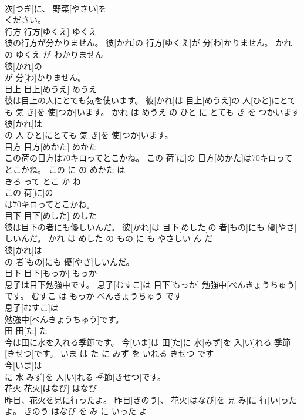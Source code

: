 \documentclass[8pt]{extreport}
\begin{document}
\begin{CJK}{UTF8}{min}
\\	次[つぎ]に、 野菜[やさい]を
\\	ください。			
\\	行方	行方[ゆくえ]	ゆくえ	
\\	彼の行方が分かりません。	彼[かれ]の 行方[ゆくえ]が 分[わ]かりません。	かれ の ゆくえ が わかりません	
\\	彼[かれ]の
\\	が 分[わ]かりません。			
\\	目上	目上[めうえ]	めうえ	
\\	彼は目上の人にとても気を使います。	彼[かれ]は 目上[めうえ]の 人[ひと]にとても 気[き]を 使[つか]います。	かれ は めうえ の ひと に とても き を つかいます	
\\	彼[かれ]は
\\	の 人[ひと]にとても 気[き]を 使[つか]います。			
\\	目方	目方[めかた]	めかた	
\\	この荷の目方は70キロってとこかね。	この 荷[に]の 目方[めかた]は70キロってとこかね。	この に の めかた は 
\\	きろ って とこ か ね	
\\	この 荷[に]の
\\	は70キロってとこかね。			
\\	目下	目下[めした]	めした	
\\	彼は目下の者にも優しいんだ。	彼[かれ]は 目下[めした]の 者[もの]にも 優[やさ]しいんだ。	かれ は めした の もの に も やさしい ん だ	
\\	彼[かれ]は
\\	の 者[もの]にも 優[やさ]しいんだ。			
\\	目下	目下[もっか]	もっか	
\\	息子は目下勉強中です。	息子[むすこ]は 目下[もっか] 勉強中[べんきょうちゅう]です。	むすこ は もっか べんきょうちゅう です	
\\	息子[むすこ]は
\\	勉強中[べんきょうちゅう]です。			
\\	田	田[た]	た	
\\	今は田に水を入れる季節です。	今[いま]は 田[た]に 水[みず]を 入[い]れる 季節[きせつ]です。	いま は た に みず を いれる きせつ です	
\\	今[いま]は
\\	に 水[みず]を 入[い]れる 季節[きせつ]です。			
\\	花火	花火[はなび]	はなび	
\\	昨日、花火を見に行ったよ。	昨日[きのう]、 花火[はなび]を 見[み]に 行[い]ったよ。	きのう はなび を み に いった よ	

\end{CJK}
\end{document}
